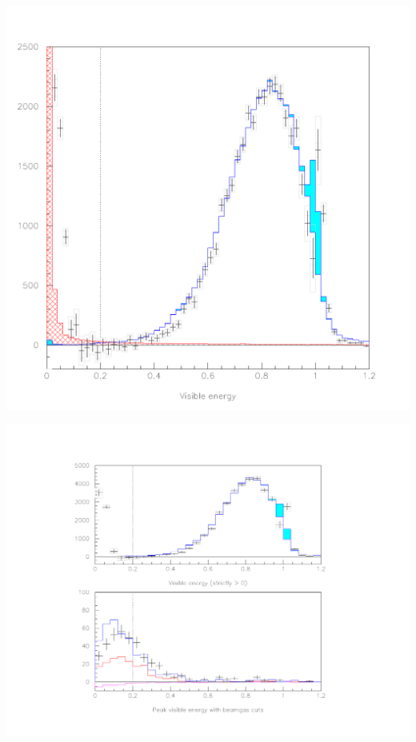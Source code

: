 \documentclass[landscape]{article}
\begin{document}
\huge
\renewcommand{\labelitemi}{-}
\setlength{\parindent}{0 cm}

\begin{center}
  \includegraphics[height=\textheight]{testrun1.pdf}
\end{center}

\pagebreak

\begin{center}
  \includegraphics[height=\textheight]{testrun2.pdf}
\end{center}
\end{document}
